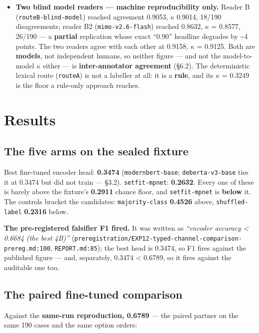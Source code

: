 \documentclass[11pt,a4paper]{article}
\begin{document}
\begin{itemize}
\item \textbf{Two blind model readers --- machine reproducibility only.} Reader B (\texttt{routeB-blind-model}) reached agreement 0.9053, $\kappa$ 0.9014, 18/190 disagreements; reader B2 (\texttt{mimo-v2.6-flash}) reached 0.8632, $\kappa$ = 0.8577, 26/190 --- a \textbf{partial} replication whose exact ``0.90'' headline degrades by \textasciitilde{}4 points. The two readers agree with each other at 0.9158, $\kappa$ = 0.9125. Both are \textbf{models}, not independent humans, so neither figure --- and not the model-to-model $\kappa$ either --- is \textbf{inter-annotator agreement} (\S6.2). The deterministic lexical route (\texttt{routeA}) is not a labeller at all: it is a \textbf{rule}, and its $\kappa$ = 0.3249 is the floor a rule-only approach reaches.
\end{itemize}

\section{Results}

\subsection{The five arms on the sealed fixture}

Best fine-tuned encoder head: \textbf{0.3474} (\texttt{modernbert-base}; \texttt{deberta-v3-base} ties it at 0.3474 but did not train --- \S3.2). \texttt{setfit-mpnet}: \textbf{0.2632}. Every one of these is barely above the fixture's \textbf{0.2911} chance floor, and \texttt{setfit-mpnet} is \textbf{below} it. The controls bracket the candidates: \texttt{majority-class} \textbf{0.4526} above, \texttt{shuffled-label} \textbf{0.2316} below.

\textbf{The pre-registered falsifier F1 fired.} It was written as \emph{``encoder accuracy < 0.6684 (the best 4B)''} (\texttt{preregistration/EXP12-typed-channel-comparison-prereg.md:100}, \texttt{REPORT.md:85}); the best head is 0.3474, so F1 fires against the published figure --- and, separately, 0.3474 < 0.6789, so it fires against the auditable one too.

\subsection{The paired fine-tuned comparison}

Against the \textbf{same-run reproduction, 0.6789} --- the paired partner on the same 190 cases and the same option orders:
\end{document}
